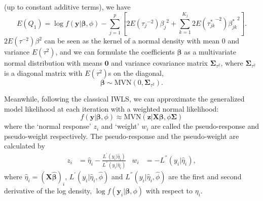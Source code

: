\documentclass[
]{article}
\begin{document}
(up to constant additive terms), we have
\begin{equation}\label{eq:EQ1_IWLS}
E(Q_1) = \log f(\textbf{y}|\boldsymbol{\beta}, \phi) - \sum\limits_{j=1}^p\left[ {2E({\tau_j}^{-2})}{\beta_j}^2 +\sum\limits_{k=1}^{K_j} {2E({\tau_{jk}^*}^{-2})}{\beta_{jk}^*}^2\right].
\end{equation} \(2E({\tau}^{-2})\beta^2\) can be seen as the kernel of a
normal density with mean 0 and variance \(E(\tau^{2})\), and we can
formulate the coefficients \(\boldsymbol{\beta}\) as a multivariate
normal distribution with means \(\boldsymbol{0}\) and variance
covariance matrix \(\boldsymbol{\Sigma}_{\tau^2}\), where
\(\boldsymbol{\Sigma}_{\tau^2}\) is a diagonal matrix with
\(E(\tau^2)\)s on the diagonal, \[
\boldsymbol{\beta }\sim \text{MVN}(0, \boldsymbol{\Sigma}_{\tau^2}).
\]

Meanwhile, following the classical IWLS, we can approximate the
generalized model likelihood at each iteration with a weighted normal
likelihood: \[
f(\textbf{y}|\boldsymbol{\beta}, \phi) \approx \text{MVN}(\textbf{z}|\boldsymbol{X} \boldsymbol{\beta}, \phi\boldsymbol{\Sigma })
\] where the `normal response' \(z_i\) and `weight' \(w_i\) are called
the pseudo-response and pseudo-weight respectively. The pseudo-response
and the pseudo-weight are calculated by \[
\begin{aligned}
z_i &= \hat\eta_i - \frac{L^{'}(y_i|\hat\eta_i)}{L^{''}(y_i|\hat\eta_i)}& w_i &= - L^{''}(y_i|\hat\eta_i),
\end{aligned}
\] where \(\hat\eta_i = (\boldsymbol{X} {\hat{\boldsymbol{\beta}}})_i\),
\(L^{'}(y_i|\hat\eta_i, \hat \phi)\) and
\(L^{''}(y_i|\hat\eta_i, \hat \phi)\) are the first and second
derivative of the log density,
\(\log f(\textbf{y}_i|\boldsymbol{\beta}, \phi)\) with respect to
\(\eta_i\).
\end{document}
